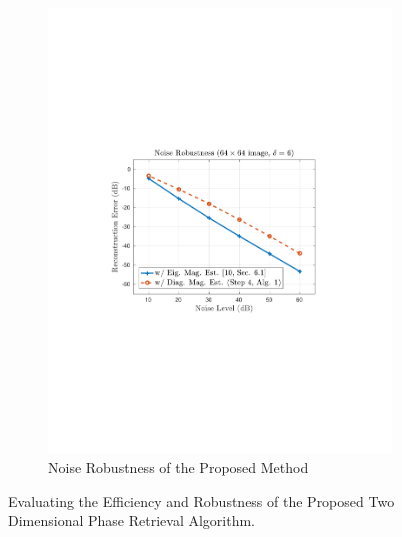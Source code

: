 \begin{figure}[hbtp]
\begin{subfigure}[b]{0.495\textwidth}
        \includegraphics[clip=true, trim = 1.10in 3.25in 0.75in 3in,scale=0.575]{noise_alt}
        \caption{Noise Robustness of the Proposed Method}
        \label{fig:noise}
    \end{subfigure} 
    \vspace{0.05in}
    \caption{Evaluating the Efficiency and Robustness of the Proposed Two Dimensional Phase
    Retrieval Algorithm.}
    \label{fig:perf}
\end{figure}
%
